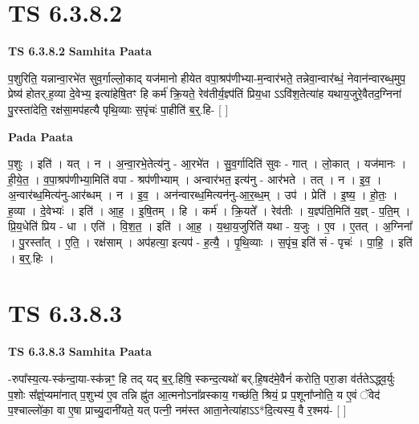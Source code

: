 \documentclass[17pt]{extarticle}
\begin{document}
\section*{ TS 6.3.8.2 }

\textbf{TS 6.3.8.2 } \newline
\textbf{Samhita Paata} \newline

प॒शुरिति॒ यन्नान्वा॒रभे॑त सुव॒र्गाल्लो॒काद् यज॑मानो हीयेत वपा॒श्रप॑णीभ्या-म॒न्वार॑भते॒ तन्नेवा॒न्वार॑ब्धं॒ नेवान॑न्वारब्ध॒मुप॒ प्रेष्य॑ होतर्.ह॒व्या दे॒वेभ्य॒ इत्या॑हेषि॒तꣳ हि कर्म॑ क्रि॒यते॒ रेव॑तीर्य॒ज्ञ्प॑तिं प्रिय॒धा ऽऽवि॑श॒तेत्या॑ह यथाय॒जुरे॒वैतद॒ग्निना॑ पु॒रस्ता॑देति॒ रक्ष॑सा॒मप॑हत्यै पृथि॒व्याः स॒पृंचः॑ पा॒हीति॑ ब॒र्॒.हि- [  ] \newline

\textbf{Pada Paata} \newline

प॒शुः । इति॑ । यत् । न । अ॒न्वा॒रभे॒तेत्य॑नु - आ॒रभे॑त । सु॒व॒र्गादिति॑ सुवः - गात् । लो॒कात् । यज॑मानः । ही॒ये॒त॒ । व॒पा॒श्रप॑णीभ्या॒मिति॑ वपा - श्रप॑णीभ्याम् । अन्वार॑भत॒ इत्य॑नु - आर॑भते । तत् । न । इ॒व॒ । अ॒न्वार॑ब्ध॒मित्य॑नु-आर॑ब्धम् । न । इ॒व॒ । अन॑न्वारब्ध॒मित्यन॑नु-आ॒र॒ब्ध॒म् । उप॑ । प्रेति॑ । इ॒ष्य॒ । हो॒तः॒ । ह॒व्या । दे॒वेभ्यः॑ । इति॑ । आ॒ह॒ । इ॒षि॒तम् । हि । कर्म॑ । क्रि॒यते᳚ । रेव॑तीः । य॒ज्ञ्प॑ति॒मिति॑ य॒ज्ञ् - प॒ति॒म् । प्रि॒य॒धेति॑ प्रिय - धा । एति॑ । वि॒श॒त॒ । इति॑ । आ॒ह॒ । य॒था॒य॒जुरिति॑ यथा - य॒जुः । ए॒व । ए॒तत् । अ॒ग्निना᳚ । पु॒रस्ता᳚त् । ए॒ति॒ । रक्ष॑साम् । अप॑हत्या॒ इत्यप॑ - ह॒त्यै॒ । पृ॒थि॒व्याः । स॒पृंच॒ इति॑ सं - पृचः॑ । पा॒हि॒ । इति॑ । ब॒र्॒.हिः ।  \newline




\section*{ TS 6.3.8.3 }

\textbf{TS 6.3.8.3 } \newline
\textbf{Samhita Paata} \newline

-रुपा᳚स्य॒त्य-स्क॑न्दा॒या-स्क॑न्नꣳ॒॒ हि तद् यद् ब॒र्॒.हिषि॒ स्कन्द॒त्यथो॑ बर्.हि॒षद॑मे॒वैनं॑ करोति॒ परा॒ङा व॑र्ततेऽद्ध्व॒र्युः प॒शोः स᳚ज्ञ्ं॒प्यमा॑नात् प॒शुभ्य॑ ए॒व तन्नि ह्नु॑त आ॒त्मनोऽना᳚व्रस्काय॒ गच्छ॑ति॒ श्रियं॒ प्र प॒शूना᳚प्नोति॒ य ए॒वं ॅवेद॑ प॒श्चाल्लो॑का॒ वा ए॒षा प्राच्यु॒दानी॑यते॒ यत् पत्नी॒ नम॑स्त आता॒नेत्या॑हाऽऽ*दि॒त्यस्य॒ वै र॒श्मय॑- [  ] \newline
\end{document}
